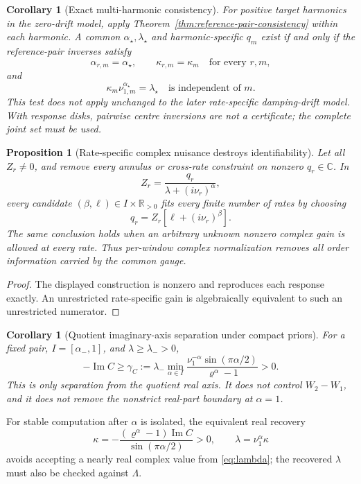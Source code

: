 \documentclass[11pt]{article}
\newtheorem{proposition}[theorem]{Proposition}
\newtheorem{corollary}[theorem]{Corollary}
\theoremstyle{definition}
\theoremstyle{remark}
\newcommand{\C}{\mathbb C}
\newcommand{\R}{\mathbb R}
\begin{document}
\begin{corollary}[Exact multi-harmonic consistency]
For positive target harmonics in the zero-drift model, apply
Theorem~\ref{thm:reference-pair-consistency} within each harmonic.  A common
\(\alpha_\star,\lambda_\star\) and harmonic-specific \(q_m\) exist if and only
if the reference-pair inverses satisfy
\[
 \alpha_{r,m}=\alpha_\star,\qquad
 \kappa_{r,m}=\kappa_m
 \quad\text{for every }r,m,
\]
and
\[
 \kappa_m\nu_{1,m}^{\alpha_\star}=\lambda_\star
 \quad\text{is independent of }m.
\]
This test does not apply unchanged to the later rate-specific damping-drift
model.  With response disks, pairwise centre inversions are not a certificate;
the complete joint set must be used.
\end{corollary}

\begin{proposition}[Rate-specific complex nuisance destroys identifiability]
\label{prop:rate-specific-no-go}
Let all \(Z_r\ne0\), and remove every annulus or cross-rate constraint on
nonzero \(q_r\in\C\).  In
\[
 Z_r=\frac{q_r}{\lambda+(i\nu_r)^\alpha},
\]
every candidate \((\beta,\ell)\in I\times\R_{>0}\) fits every finite number
of rates by choosing
\[
 q_r=Z_r[\ell+(i\nu_r)^\beta].
\]
The same conclusion holds when an arbitrary unknown nonzero complex gain is
allowed at every rate.  Thus per-window complex normalization removes all
order information carried by the common gauge.
\end{proposition}
\begin{proof}
The displayed construction is nonzero and reproduces each response exactly.
An unrestricted rate-specific gain is algebraically equivalent to such an
unrestricted numerator.
\end{proof}

\begin{corollary}[Quotient imaginary-axis separation under compact priors]
\label{cor:quotient-imaginary-margin}
For a fixed pair, \(I=[\alpha_-,1]\), and \(\lambda\ge\lambda_->0\),
\[
 -\operatorname{Im}C\ge\gamma_C:=\lambda_-
 \min_{\alpha\in I}
 \frac{\nu_1^{-\alpha}\sin(\pi\alpha/2)}
      {\varrho^\alpha-1}>0.
\]
This is only separation from the quotient real axis.  It does not control
\(W_2-W_1\), and it does not remove the nonstrict real-part boundary at
\(\alpha=1\).
\end{corollary}

For stable computation after \(\alpha\) is isolated, the equivalent real
recovery
\[
 \kappa=-\frac{(\varrho^\alpha-1)\operatorname{Im}C}
               {\sin(\pi\alpha/2)}>0,\qquad
 \lambda=\nu_1^\alpha\kappa
\]
avoids accepting a nearly real complex value from \eqref{eq:lambda}; the
recovered \(\lambda\) must also be checked against \(\Lambda\).
\end{document}
